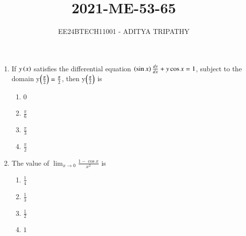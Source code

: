 \documentclass[journal,12pt,onecolumn]{IEEEtran}
\theoremstyle{remark}
\begin{document}

\vspace{3cm}

\title{2021-ME-53-65}
\author{EE24BTECH11001 -  ADITYA TRIPATHY}
\maketitle

\renewcommand{\thefigure}{\theenumi}
\renewcommand{\thetable}{\theenumi}

\begin{enumerate}
    \item 
        If $y\left(x\right)$ satisfies the differential equation $\left(\sin x\right)\frac{dy}{dx} + y\cos x = 1$,
        subject to the domain y$\left(\frac{\pi}{2}\right) = \frac{\pi}{2}$, then y$\left(\frac{\pi}{2}\right)$
        is 
        \hfill{}
        \begin{multicols}{4}
            \begin{enumerate}
                \item 0
                    \columnbreak
                \item $\frac{\pi}{6}$
                    \columnbreak
                \item $\frac{\pi}{3}$
                    \columnbreak
                \item $\frac{\pi}{2}$
            \end{enumerate}
        \end{multicols}
    \item The value of $\lim_{x \rightarrow 0} \frac{1 - \cos x}{x^2}$ is
        \hfill{}
        \begin{multicols}{4}
            \begin{enumerate}
                \item $\frac{1}{4}$
                    \columnbreak
                \item $\frac{1}{3}$
                    \columnbreak
                \item $\frac{1}{2}$
                    \columnbreak
                \item $1$
            \end{enumerate}
        \end{multicols}


\end{enumerate}
\end{document}
